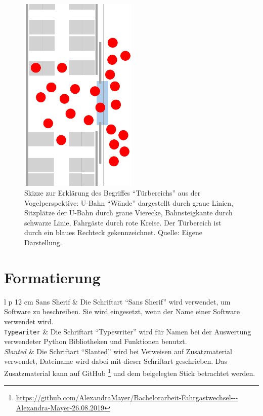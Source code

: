  \begin{figure}[H]
	\centering
		\includegraphics[angle=270, width=0.5\textwidth]{pictures/introduction/defenitions/example_doorarea.png}
	\caption{Skizze zur Erklärung des Begriffes "`Türbereichs"' aus der Vogelperspektive: U-Bahn "`Wände"' dargestellt durch graue Linien, Sitzplätze der U-Bahn durch graue Vierecke, Bahnsteigkante durch schwarze Linie, Fahrgäste durch rote Kreise. Der Türbereich ist durch ein blaues Rechteck gekennzeichnet. Quelle: Eigene Darstellung.}
	\label{fig:Doorarea}
\end{figure} 
\section{Formatierung}
\begin{longtable}{ l p {12 cm}}
	\textsf{Sans Sherif}	& Die Schriftart "`Sans Sherif"' wird verwendet, um Software zu beschreiben. Sie wird eingesetzt, wenn der Name einer Software verwendet wird.\\
	\texttt{Typewriter}	& Die Schriftart "`Typewriter"' wird für Namen bei der Auswertung verwendeter Python Bibliotheken und Funktionen benutzt. \\
	\textsl{Slanted}	& Die Schriftart "`Slanted"' wird bei Verweisen auf Zusatzmaterial verwendet, Dateiname wird dabei mit dieser Schriftart geschrieben. Das Zusatzmaterial kann auf GitHub \footnote{\url{https://github.com/AlexandraMayer/Bachelorarbeit-Fahrgastwechsel---Alexandra-Mayer-26.08.2019}} und dem beigelegten Stick betrachtet werden.
\end{longtable}